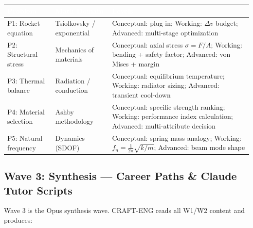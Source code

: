 \documentclass[11pt,letterpaper]{article}
\newcommand{\tableheader}[1]{\textbf{\sffamily\textcolor{white}{#1}}}
\begin{document}
\begin{center}
\begin{tabularx}{\textwidth}{L{2.5cm}L{3cm}X}
\toprule
{}
\tableheader{Problem} & \tableheader{Math Domain} & \tableheader{Levels} \\
\midrule
P1: Rocket equation & Tsiolkovsky / exponential & Conceptual: plug-in; Working: $\Delta v$ budget; Advanced: multi-stage optimization \\
P2: Structural stress & Mechanics of materials & Conceptual: axial stress $\sigma=F/A$; Working: bending + safety factor; Advanced: von Mises + margin \\
P3: Thermal balance & Radiation / conduction & Conceptual: equilibrium temperature; Working: radiator sizing; Advanced: transient cool-down \\
P4: Material selection & Ashby methodology & Conceptual: specific strength ranking; Working: performance index calculation; Advanced: multi-attribute decision \\
P5: Natural frequency & Dynamics (SDOF) & Conceptual: spring-mass analogy; Working: $f_n = \frac{1}{2\pi}\sqrt{k/m}$; Advanced: beam mode shape \\
\bottomrule
\end{tabularx}
\end{center}

\subsection{Wave 3: Synthesis --- Career Paths \& Claude Tutor Scripts}

Wave 3 is the Opus synthesis wave. CRAFT-ENG reads all W1/W2 content and produces:
\end{document}
